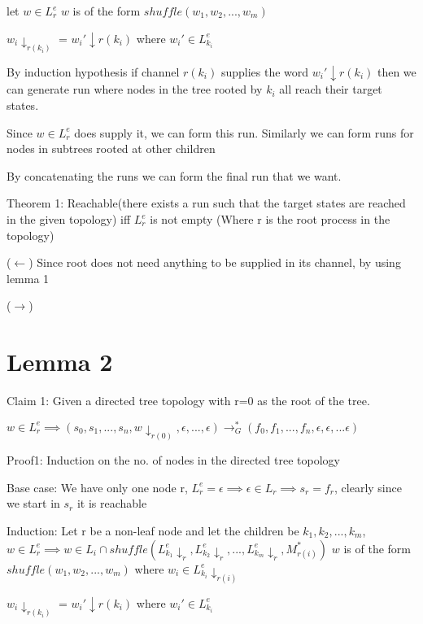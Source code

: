 \documentclass{article}
\begin{document}
let $w \in L_r^e$
$w$ is of the form $shuffle(w_1, w_2, ..., w_m)$

$w_i\downarrow_{r(k_i)}$ = $w_i'\downarrow{r(k_i)}$ where $w_i' \in L_{k_i}^e$


By induction hypothesis if channel $r(k_i)$ supplies the word $w_i'\downarrow{r(k_i)}$ then we can generate run where nodes in the tree rooted by $k_i$ all reach their target states. 

Since $w \in L_r^e$ does supply it, we can form this run. 
Similarly we can form runs for nodes in subtrees rooted at other children


By concatenating the runs we can form the final run that we want.



Theorem 1:  Reachable(there exists a run such that the target states are reached in the given topology) iff $L_r^e$ is not empty (Where r is the root process in the topology) 

($\leftarrow$) Since root does not need anything to be supplied in its channel, by using lemma 1

($\rightarrow$) 





\section{Lemma 2}



Claim 1: Given a directed tree topology with r=0 as the root of the tree.


$w \in L_r^e \implies (s_0, s_1, ...,s_n, w \downarrow_{r(0)}, \epsilon, ...,\epsilon) \rightarrow_G^* (f_0, f_1, ..., f_n, \epsilon, \epsilon, ... \epsilon)$

Proof1: 
Induction on the no. of nodes in the directed tree topology

Base case: We have only one node r,  $L_r^e = {\epsilon} \implies \epsilon \in L_r \implies s_r = f_r$, clearly since we start in $s_r$ it is reachable

Induction: 
Let r be a non-leaf node and let the children be $k_1, k_2, ..., k_m$,  
$w \in L_r^e \implies w \in L_i \cap shuffle(L_{k_1}^e\!\!\!\downarrow_{r}, L_{k_2}^e\!\!\!\downarrow_{r}, ..., L_{k_m}^e\!\!\!\downarrow_{r}, M_{r(i)}^*)$
$w$ is of the form $shuffle(w_1, w_2, ..., w_m)$ where $w_i \in L_{k_i}^e\!\!\!\downarrow_{r(i)}$

$w_i\downarrow_{r(k_i)}$ = $w_i'\downarrow{r(k_i)}$ where $w_i' \in L_{k_i}^e$
\end{document}
